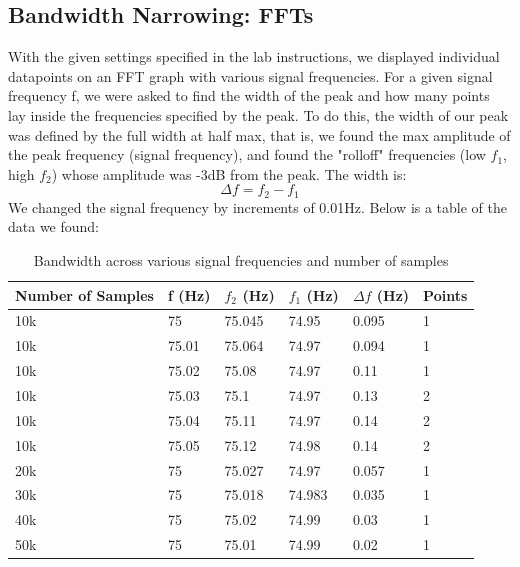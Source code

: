 \documentclass{article}
\begin{document}
\subsection{Bandwidth Narrowing: FFTs}
    With the given settings specified in the lab instructions, we displayed individual datapoints on an FFT graph with various signal frequencies. For a given signal frequency f, we were asked to find the width of the peak and how many points lay inside the frequencies specified by the peak. To do this, the width of our peak was defined by the full width at half max, that is, we found the max amplitude of the peak frequency (signal frequency), and found the "rolloff" frequencies (low $f_1$, high $f_2$) whose amplitude was -3dB from the peak. The width is:
    \begin{equation}
        \Delta f = f_2 - f_1
    \end{equation}
    We changed the signal frequency by increments of 0.01Hz. Below is a table of the data we found:
    \begin{table}[H]
        \centering
        \caption{Bandwidth across various signal frequencies and number of samples}
        \label{my-label}
        \begin{tabular}{llllll}
        \textbf{Number of Samples} & \textbf{f (Hz)} & \textbf{$f_2$ (Hz)} & \textbf{$f_1$ (Hz)} & \textbf{$\Delta f$ (Hz)} & \textbf{Points} \\ \hline
        10k & 75 & 75.045 & 74.95 & 0.095 & 1 \\
        10k & 75.01 & 75.064 & 74.97 & 0.094 & 1 \\
        10k & 75.02 & 75.08 & 74.97 & 0.11 & 1 \\
        10k & 75.03 & 75.1 & 74.97 & 0.13 & 2 \\
        10k & 75.04 & 75.11 & 74.97 & 0.14 & 2 \\
        10k & 75.05 & 75.12 & 74.98 & 0.14 & 2 \\
        20k & 75 & 75.027 & 74.97 & 0.057 & 1 \\
        30k & 75 & 75.018 & 74.983 & 0.035 & 1 \\
        40k & 75 & 75.02 & 74.99 & 0.03 & 1 \\
        50k & 75 & 75.01 & 74.99 & 0.02 & 1
        \end{tabular}
        \end{table}
\end{document}
